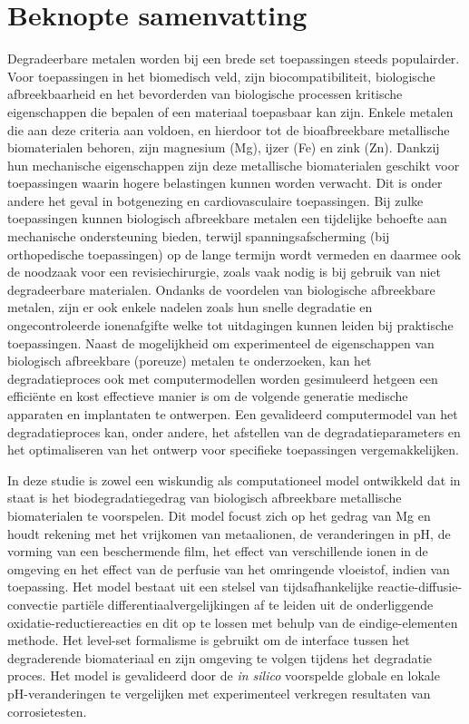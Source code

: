\chapter{Beknopte samenvatting}

Degradeerbare metalen worden bij een brede set toepassingen steeds populairder. Voor toepassingen in het biomedisch veld, zijn biocompatibiliteit, biologische afbreekbaarheid en het bevorderden van biologische processen kritische eigenschappen die bepalen of een materiaal toepasbaar kan zijn. Enkele metalen die aan deze criteria aan voldoen, en hierdoor tot de bioafbreekbare metallische biomaterialen behoren, zijn magnesium (Mg), ijzer (Fe) en zink (Zn). Dankzij hun mechanische eigenschappen zijn deze metallische biomaterialen geschikt voor toepassingen waarin hogere belastingen kunnen worden verwacht. Dit is onder andere het geval in botgenezing en cardiovasculaire toepassingen. Bij zulke toepassingen kunnen biologisch afbreekbare metalen een tijdelijke behoefte aan mechanische ondersteuning bieden, terwijl spanningsafscherming (bij orthopedische toepassingen) op de lange termijn wordt vermeden en daarmee ook de noodzaak voor een revisiechirurgie, zoals vaak nodig is bij gebruik van niet degradeerbare materialen. Ondanks de voordelen van biologische afbreekbare metalen, zijn er ook enkele nadelen zoals hun snelle degradatie en ongecontroleerde ionenafgifte welke tot uitdagingen kunnen leiden bij praktische toepassingen. Naast de mogelijkheid om experimenteel de eigenschappen van biologisch afbreekbare (poreuze) metalen te onderzoeken, kan het degradatieproces ook met computermodellen worden gesimuleerd hetgeen een efficiënte en kost effectieve manier is om de volgende generatie medische apparaten en implantaten te ontwerpen. Een gevalideerd computermodel van het degradatieproces kan, onder andere, het afstellen van de degradatieparameters en het optimaliseren van het ontwerp voor specifieke toepassingen vergemakkelijken. 

In deze studie is zowel een wiskundig als computationeel model ontwikkeld dat in staat is het biodegradatiegedrag van biologisch afbreekbare metallische biomaterialen te voorspelen. Dit model focust zich op het gedrag van Mg en houdt rekening met het vrijkomen van metaalionen, de veranderingen in pH, de vorming van een beschermende film, het effect van verschillende ionen in de omgeving en het effect van de perfusie van het omringende vloeistof, indien van toepassing. Het model bestaat uit een stelsel van tijdsafhankelijke reactie-diffusie-convectie partiële differentiaalvergelijkingen af te leiden uit de onderliggende oxidatie-reductiereacties en dit op te lossen met behulp van de eindige-elementen methode. Het level-set formalisme is gebruikt om de interface tussen het degraderende biomateriaal en zijn omgeving te volgen tijdens het degradatie proces. Het model is gevalideerd door de \textit{in silico} voorspelde globale en lokale pH-veranderingen te vergelijken met experimenteel verkregen resultaten van corrosietesten. 


